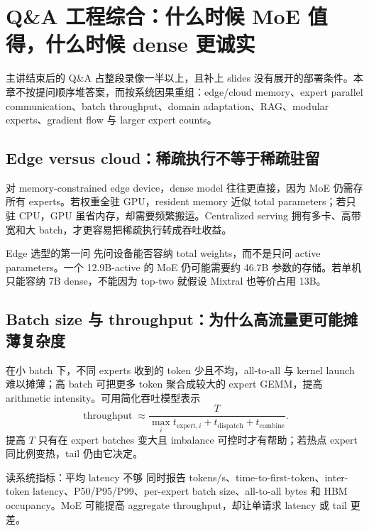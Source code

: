 \section{Q\&A 工程综合：什么时候 MoE 值得，什么时候 dense 更诚实}

主讲结束后的 Q\&A 占整段录像一半以上，且补上 slides 没有展开的部署条件。本章不按提问顺序堆答案，而按系统因果重组：edge/cloud memory、expert parallel communication、batch throughput、domain adaptation、RAG、modular experts、gradient flow 与 larger expert counts。

\subsection{Edge versus cloud：稀疏执行不等于稀疏驻留}

对 memory-constrained edge device，dense model 往往更直接，因为 MoE 仍需存所有 experts。若权重全驻 GPU，resident memory 近似 total parameters；若只驻 CPU，GPU 虽省内存，却需要频繁搬运。Centralized serving 拥有多卡、高带宽和大 batch，才更容易把稀疏执行转成吞吐收益。

\begin{importantbox}{Edge 选型的第一问}
先问设备能否容纳 total weights，而不是只问 active parameters。一个 12.9B-active 的 MoE 仍可能需要约 46.7B 参数的存储。若单机只能容纳 7B dense，不能因为 top-two 就假设 Mixtral 也等价占用 13B。
\end{importantbox}


\subsection{Batch size 与 throughput：为什么高流量更可能摊薄复杂度}

在小 batch 下，不同 experts 收到的 token 少且不均，all-to-all 与 kernel launch 难以摊薄；高 batch 可把更多 token 聚合成较大的 expert GEMM，提高 arithmetic intensity。可用简化吞吐模型表示
\[
\operatorname{throughput}\approx \frac{T}{\max_i t_{\text{expert},i}+t_{\text{dispatch}}+t_{\text{combine}}}.
\]
提高 $T$ 只有在 expert batches 变大且 imbalance 可控时才有帮助；若热点 expert 同比例变热，tail 仍由它决定。

\begin{knowledgebox}{读系统指标：平均 latency 不够}
同时报告 tokens/s、time-to-first-token、inter-token latency、P50/P95/P99、per-expert batch size、all-to-all bytes 和 HBM occupancy。MoE 可能提高 aggregate throughput，却让单请求 latency 或 tail 更差。
\end{knowledgebox}

